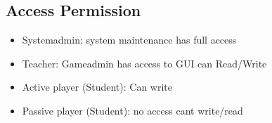 \subsection{Access Permission}

\begin{itemize}
\item Systemadmin: system maintenance has full access
\item Teacher: Gameadmin has access to GUI can Read/Write
\item Active player (Student): Can write
\item Passive player (Student): no access cant write/read
\end{itemize}